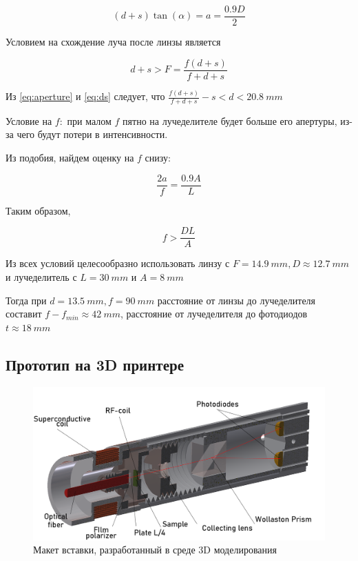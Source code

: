 \documentclass[10pt]{article}
\begin{document}
\begin{equation}\label{eq:aperture}
(d + s)\tan(\alpha) = a = \frac{0.9D}{2}
\end{equation}

Условием на схождение луча после линзы является 

\begin{equation}\label{eq:ds}
d + s > F = \frac{f(d + s)}{f + d +s}
\end{equation}

Из \eqref{eq:aperture} и \eqref{eq:ds} следует, что $\frac{f(d + s)}{f + d +s} - s < d < 20.8\ mm$ \

Условие на $f$:\
при малом $f$ пятно на лучеделителе будет больше его апертуры, из-за чего будут потери в интенсивности.

Из подобия, найдем оценку на $f$ снизу:

\begin{equation}\label{eq:2a}
\frac{2a}{f} = \frac{0.9A}{L}
\end{equation}

Таким образом,

\begin{equation}\label{eq:f}
f > \frac{DL}{A}
\end{equation}

Из всех условий целесообразно использовать линзу с $F = 14.9\ mm, D \approx 12.7\ mm$ и лучеделитель с $L = 30\ mm$ и $A = 8\ mm$

Тогда при $d = 13.5\ mm, f = 90\ mm$ расстояние от линзы до лучеделителя составит $f - f_{min} \approx 42\ mm$, расстояние от лучеделителя до фотодиодов $t \approx 18\ mm$ 


\subsection{Прототип на 3D принтере}

\begin{figure}[h!]
	\centering
	\includegraphics[scale = 0.2]{assemble.png}
	\caption{Макет вставки, разработанный в среде 3D моделирования}
	\label{fig:assemble}
\end{figure}
\end{document}
